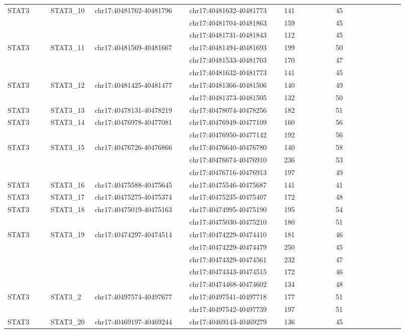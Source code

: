 \begin{landscape}
\begin{longtable}{p{0.1\linewidth}|p{0.1\linewidth}p{0.22\linewidth}p{0.22\linewidth}p{0.12\linewidth}p{0.16\linewidth}}
\\
STAT3 & STAT3\_10 & chr17:40481762-40481796 & chr17:40481632-40481773 & 141 & 45
\\
 & & & chr17:40481704-40481863 & 159 & 45
\\
 & & & chr17:40481731-40481843 & 112 & 45
\\
STAT3 & STAT3\_11 & chr17:40481569-40481667 & chr17:40481494-40481693 & 199 & 50
\\
 & & & chr17:40481533-40481703 & 170 & 47
\\
 & & & chr17:40481632-40481773 & 141 & 45
\\
STAT3 & STAT3\_12 & chr17:40481425-40481477 & chr17:40481366-40481506 & 140 & 49
\\
 & & & chr17:40481373-40481505 & 132 & 50
\\
STAT3 & STAT3\_13 & chr17:40478131-40478219 & chr17:40478074-40478256 & 182 & 51
\\
STAT3 & STAT3\_14 & chr17:40476978-40477081 & chr17:40476949-40477109 & 160 & 56
\\
 & & & chr17:40476950-40477142 & 192 & 56
\\
STAT3 & STAT3\_15 & chr17:40476726-40476866 & chr17:40476640-40476780 & 140 & 58
\\
 & & & chr17:40476674-40476910 & 236 & 53
\\
 & & & chr17:40476716-40476913 & 197 & 49
\\
STAT3 & STAT3\_16 & chr17:40475588-40475645 & chr17:40475546-40475687 & 141 & 41
\\
STAT3 & STAT3\_17 & chr17:40475275-40475374 & chr17:40475235-40475407 & 172 & 48
\\
STAT3 & STAT3\_18 & chr17:40475019-40475163 & chr17:40474995-40475190 & 195 & 54
\\
 & & & chr17:40475030-40475210 & 180 & 51
\\
STAT3 & STAT3\_19 & chr17:40474297-40474514 & chr17:40474229-40474410 & 181 & 46
\\
 & & & chr17:40474229-40474479 & 250 & 45
\\
 & & & chr17:40474329-40474561 & 232 & 47
\\
 & & & chr17:40474343-40474515 & 172 & 46
\\
 & & & chr17:40474468-40474602 & 134 & 48
\\
STAT3 & STAT3\_2 & chr17:40497574-40497677 & chr17:40497541-40497718 & 177 & 51
\\
 & & & chr17:40497542-40497739 & 197 & 51
\\
STAT3 & STAT3\_20 & chr17:40469197-40469244 & chr17:40469143-40469279 & 136 & 45

\end{longtable}
\end{landscape}
